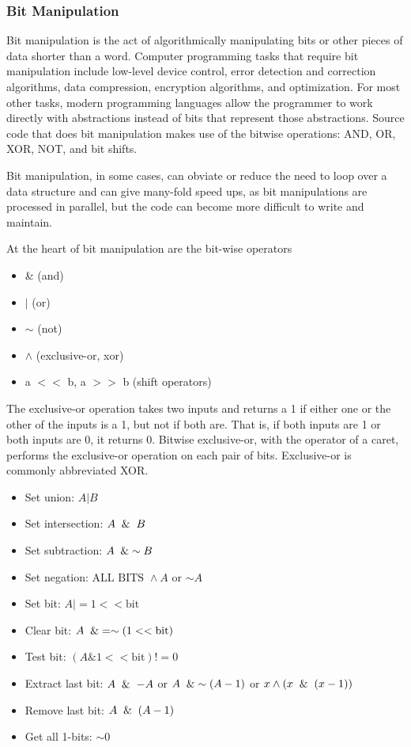 \documentclass{article}
\begin{document}
    \subsubsection{Bit Manipulation}
    Bit manipulation is the act of algorithmically manipulating bits or other pieces of data shorter than a word. Computer programming tasks that require bit manipulation include low-level device control, error detection and correction algorithms, data compression, encryption algorithms, and optimization. For most other tasks, modern programming languages allow the programmer to work directly with abstractions instead of bits that represent those abstractions. Source code that does bit manipulation makes use of the bitwise operations: AND, OR, XOR, NOT, and bit shifts.
    
    Bit manipulation, in some cases, can obviate or reduce the need to loop over a data structure and can give many-fold speed ups, as bit manipulations are processed in parallel, but the code can become more difficult to write and maintain.
    
    At the heart of bit manipulation are the bit-wise operators \begin{itemize}
        \item \& (and)
        \item $\vert$ (or)
        \item $\sim$ (not)
        \item $\wedge$ (exclusive-or, xor)
        \item a $<<$ b, a $>>$ b (shift operators)
    \end{itemize}
    The exclusive-or operation takes two inputs and returns a 1 if either one or the other of the inputs is a 1, but not if both are. That is, if both inputs are 1 or both inputs are 0, it returns 0. Bitwise exclusive-or, with the operator of a caret, performs the exclusive-or operation on each pair of bits. Exclusive-or is commonly abbreviated XOR.
    
    \begin{itemize}
        \item Set union: $A \vert B$
        \item Set intersection: $A \And B$
        \item Set subtraction: $A \And \sim B$
        \item Set negation: $\text{ALL BITS } \wedge A$ or $\sim A$
        \item Set bit: $A \vert= 1 <<  \text{bit}$
        \item Clear bit: $A \And = \sim (1 << \text{bit})$
        \item Test bit: $(A \& 1 << \text{bit}) != 0$
        \item Extract last bit: $A\And-A$ or $A \And \sim (A-1)$ or $x\wedge (x \And (x -1))$
        \item Remove last bit: $A \And (A-1)$
        \item Get all 1-bits: $\sim 0$
    \end{itemize}
    
\end{document}
